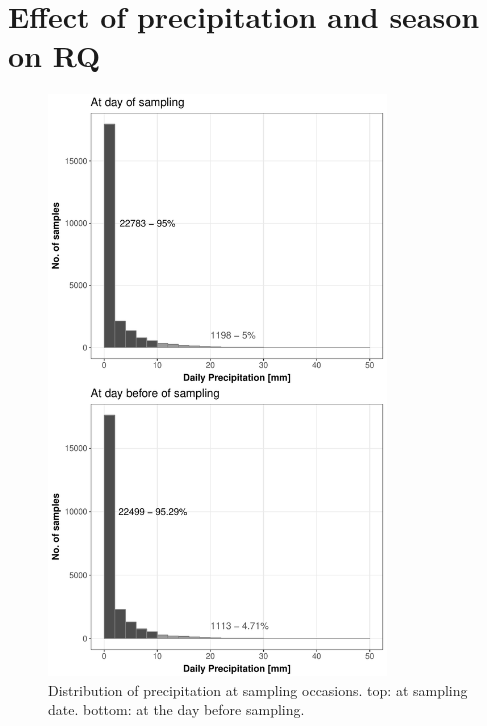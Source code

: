\documentclass[pdftex,
	a4paper,
	titlepage=false]{scrreprt}
\begin{document}
\chapter{Effect of precipitation and season on RQ}
\begin{figure}[ht]
	\centering
	\includegraphics[width = 0.8\textwidth]{precip}
	\caption[Distribution of precipitation at sampling occasions.]{Distribution of precipitation at sampling occasions. top: at sampling date. bottom: at the day before sampling.}
	\label{fig:precip}
\end{figure}

\newpage

\newpage

\end{document}
